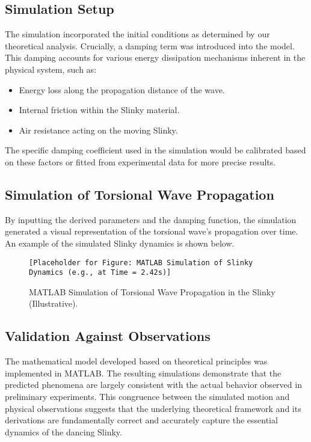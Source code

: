 \documentclass{mcmthesis}  %
\begin{document}
\subsection{Simulation Setup}
The simulation incorporated the initial conditions as determined by our theoretical analysis. Crucially, a damping term was introduced into the model. This damping accounts for various energy dissipation mechanisms inherent in the physical system, such as:
\begin{itemize}
    \item Energy loss along the propagation distance of the wave.
    \item Internal friction within the Slinky material.
    \item Air resistance acting on the moving Slinky.
\end{itemize}
The specific damping coefficient used in the simulation would be calibrated based on these factors or fitted from experimental data for more precise results.

\subsection{Simulation of Torsional Wave Propagation}
By inputting the derived parameters and the damping function, the simulation generated a visual representation of the torsional wave's propagation over time. An example of the simulated Slinky dynamics is shown below.

\begin{figure}[h!]
    \centering
    \texttt{[Placeholder for Figure: MATLAB Simulation of Slinky Dynamics (e.g., at Time = 2.42s)]}
    \caption{MATLAB Simulation of Torsional Wave Propagation in the Slinky (Illustrative).}
    \label{fig:matlab_simulation}
\end{figure}

\subsection{Validation Against Observations}
The mathematical model developed based on theoretical principles was implemented in MATLAB. The resulting simulations demonstrate that the predicted phenomena are largely consistent with the actual behavior observed in preliminary experiments. This congruence between the simulated motion and physical observations suggests that the underlying theoretical framework and its derivations are fundamentally correct and accurately capture the essential dynamics of the dancing Slinky.
\end{document}
